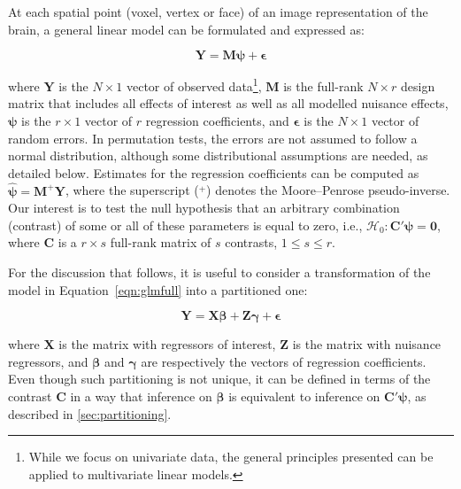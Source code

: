 At each spatial point (voxel, vertex or face) of an image representation of the brain, a general linear model \citep{Searle1971} can be formulated and expressed as:

\begin{equation}
\mathbf{Y} =  \mathbf{M} \boldsymbol{\psi} + \boldsymbol{\epsilon}
\label{eqn:glmfull}
\end{equation}

\noindent
where $\mathbf{Y}$ is the $N \times 1$ vector of observed data\footnote{While we focus on univariate data, the general principles presented can be applied to multivariate linear models.}, $\mathbf{M}$ is the full-rank $N \times r$ design matrix that includes all effects of interest as well as all modelled nuisance effects, $\boldsymbol{\psi}$ is the $r \times 1$ vector of $r$ regression coefficients, and $\boldsymbol{\epsilon}$ is the $N \times 1$ vector of random errors. In permutation tests, the errors are not assumed to follow a normal distribution, although some distributional assumptions are needed, as detailed below. Estimates for the regression coefficients can be computed as $\boldsymbol{\hat{\psi}} = \mathbf{M}^{+}\mathbf{Y}$, where the superscript ($^{+}$) denotes the Moore--Penrose pseudo-inverse. Our interest is to test the null hypothesis that an arbitrary combination (contrast) of some or all of these parameters is equal to zero, i.e., $\mathcal{H}_{0} : \mathbf{C}'\boldsymbol{\psi} =\boldsymbol{0}$, where $\mathbf{C}$ is a $r \times s$ full-rank matrix of $s$ contrasts, $1 \leqslant s \leqslant r$.

For the discussion that follows, it is useful to consider a transformation of the model in Equation~\ref{eqn:glmfull} into a partitioned one:

\begin{equation}
\mathbf{Y} = \mathbf{X}\boldsymbol{\beta} + \mathbf{Z}\boldsymbol{\gamma} + \boldsymbol{\epsilon}
\label{eqn:glmpart}
\end{equation}

\noindent
where $\mathbf{X}$ is the matrix with regressors of interest, $\mathbf{Z}$ is the matrix with nuisance regressors, and $\boldsymbol{\beta}$ and $\boldsymbol{\gamma}$ are respectively the vectors of regression coefficients. Even though such partitioning is not unique, it can be defined in terms of the contrast $\mathbf{C}$ in a way that inference on $\boldsymbol{\beta}$ is equivalent to inference on $\mathbf{C}'\boldsymbol{\psi}$, as described in \ref{sec:partitioning}.

